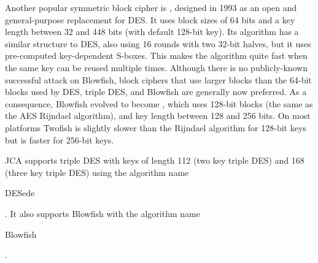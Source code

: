 Another popular symmetric block cipher is , designed in 1993 as an
open and general-purpose replacement for DES. It uses block sizes of 64 bits and a key
length between 32 and 448 bits (with default 128-bit key). Its algorithm
has a similar structure to DES, also using 16 rounds with two 32-bit halves,
but it uses pre-computed key-dependent S-boxes. This makes the algorithm quite fast
when the same key can be reused multiple times.
Although there is no publicly-known successful attack on Blowfish, block ciphers
that use larger blocks than the 64-bit blocks used by DES, triple DES,
and Blowfish are generally now preferred.
As a consequence, Blowfish evolved to become ,
which uses 128-bit blocks (the same as the AES Rijndael algorithm),
and key length between 128 and 256 bits. On most platforms Twofish is slightly
slower than the Rijndael algorithm for 128-bit keys but is faster for 256-bit keys.

JCA supports triple DES with keys of length 112 (two key triple DES) and
168 (three key triple DES) using the algorithm name \begin{code}DESede\end{code}.
It also supports Blowfish with the algorithm name \begin{code}Blowfish\end{code}.

